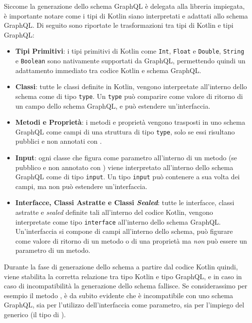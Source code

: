 Siccome la generazione dello schema GraphQL è delegata alla libreria impiegata, è importante notare come i tipi di Kotlin siano interpretati e adattati
allo schema GraphQL. Di seguito sono riportate le trasformazioni tra tipi di Kotlin e tipi GraphQL:
\begin{itemize}
    \item \textbf{Tipi Primitivi}: i tipi primitivi di Kotlin come \texttt{Int}, \texttt{Float} e \texttt{Double}, \texttt{String} e \texttt{Boolean}
        sono nativamente supportati da GraphQL, permettendo quindi un adattamento immediato tra codice Kotlin e schema GraphQL.
    \item \textbf{Classi}: tutte le classi definite in Kotlin, vengono interpretate all'interno dello schema come di tipo \texttt{type}. Un \texttt{type}
        può comparire come valore di ritorno di un campo dello schema GraphQL, e può estendere un'interfaccia.
    \item \textbf{Metodi e Proprietà}: i metodi e proprietà vengono trasposti in uno schema GraphQL come campi di una struttura di tipo
        \texttt{type}, solo se essi risultano pubblici e non annotati con .
    \item \textbf{Input}: ogni classe che figura come parametro all'interno di un metodo (se pubblico e non annotato con ) viene
        interpretato all'interno dello schema GraphQL come di tipo \texttt{input}. Un tipo \texttt{input} può contenere a sua volta dei campi,
        ma non può estendere un'interfaccia.
    \item \textbf{Interfacce, Classi Astratte e Classi \textit{Sealed}}: tutte le interfacce, classi astratte e \textit{sealed} definite tali all'interno del codice Kotlin,
        vengono interpretate come tipo \texttt{interface} all'interno dello schema GraphQL. Un'interfaccia si compone di campi all'interno dello schema, può figurare come
        valore di ritorno di un metodo o di una proprietà ma \textit{non} può essere un parametro di un metodo.
\end{itemize}
Durante la fase di generazione dello schema a partire dal codice Kotlin quindi, viene stabilita la corretta relazione tra tipo Kotlin e tipo GraphQL, e
in caso in caso di incompatibilità la generazione dello schema fallisce. Se considerassimo per esempio il metodo ,
è da subito evidente che è incompatibile con uno schema GraphQL, sia per l'utilizzo dell'interfaccia  come parametro, sia
per l'impiego del generico  (il tipo di ).

